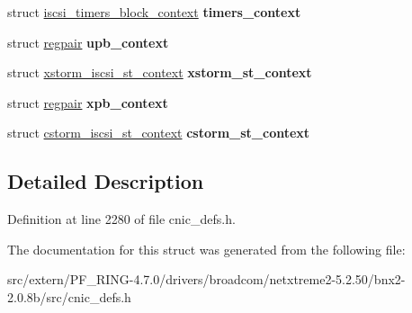 \begin{DoxyCompactItemize}
\item 
\hypertarget{structiscsi__context_a0d09e165325a9422936d367d1e3236d3}{
struct \hyperlink{structiscsi__timers__block__context}{iscsi\_\-timers\_\-block\_\-context} {\bfseries timers\_\-context}}
\label{structiscsi__context_a0d09e165325a9422936d367d1e3236d3}

\item 
\hypertarget{structiscsi__context_a883637e9e65223feac5c213e0ec33fa0}{
struct \hyperlink{structregpair}{regpair} {\bfseries upb\_\-context}}
\label{structiscsi__context_a883637e9e65223feac5c213e0ec33fa0}

\item 
\hypertarget{structiscsi__context_a6c975f161e8d334f0ef9290d6b09895c}{
struct \hyperlink{structxstorm__iscsi__st__context}{xstorm\_\-iscsi\_\-st\_\-context} {\bfseries xstorm\_\-st\_\-context}}
\label{structiscsi__context_a6c975f161e8d334f0ef9290d6b09895c}

\item 
\hypertarget{structiscsi__context_a74166eb9a7538f05943bbd59e4f0dfc4}{
struct \hyperlink{structregpair}{regpair} {\bfseries xpb\_\-context}}
\label{structiscsi__context_a74166eb9a7538f05943bbd59e4f0dfc4}

\item 
\hypertarget{structiscsi__context_a867f7be8553e8803495401c2d4c5732e}{
struct \hyperlink{structcstorm__iscsi__st__context}{cstorm\_\-iscsi\_\-st\_\-context} {\bfseries cstorm\_\-st\_\-context}}
\label{structiscsi__context_a867f7be8553e8803495401c2d4c5732e}

\end{DoxyCompactItemize}


\subsection{Detailed Description}


Definition at line 2280 of file cnic\_\-defs.h.



The documentation for this struct was generated from the following file:\begin{DoxyCompactItemize}
\item 
src/extern/PF\_\-RING-\/4.7.0/drivers/broadcom/netxtreme2-\/5.2.50/bnx2-\/2.0.8b/src/cnic\_\-defs.h\end{DoxyCompactItemize}
